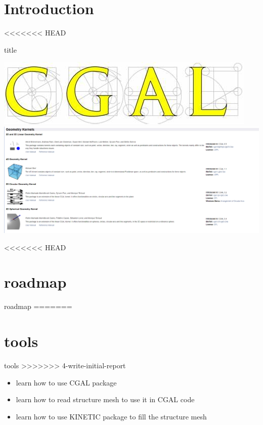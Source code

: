 \documentclass[10pt]{beamer}
\begin{document}
\begin{frame}
    \tableofcontents
\end{frame}
\section{Introduction}

<<<<<<< HEAD

\begin{frame}{title}
    
    \includegraphics[scale = 0.2]{CGAL_logo.png}
    \includegraphics[scale =   0.3 ]{exemple.png}

\end{frame}

<<<<<<< HEAD
\section{roadmap}

\begin{frame}{roadmap}
=======
\section{tools}

\begin{frame}{tools}
>>>>>>> 4-write-initial-report
    \begin{itemize}
        \item learn how to use CGAL package
        \item learn how to read structure mesh to use it in CGAL code
        \item learn how to use KINETIC package to fill the structure mesh  
    \end{itemize}
\end{frame}
\begin{frame}
    
\end{frame}
\end{frame}
\end{document}
